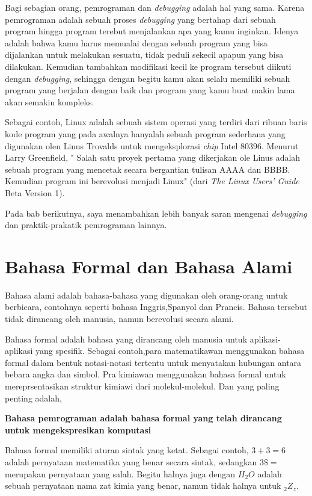 Bagi sebagian orang, pemrograman dan \textit{debugging} adalah hal yang sama. Karena pemrograman adalah sebuah proses \textit{debugging} yang bertahap dari sebuah program hingga program terebut menjalankan apa yang kamu inginkan. Idenya adalah bahwa kamu harus memualai dengan sebuah program yang bisa dijalankan untuk melakukan sesuatu, tidak peduli sekecil apapun yang bisa dilakukan. Kemudian tambahkan modifikasi kecil ke program tersebut diikuti dengan \textit{debugging}, sehingga dengan begitu kamu akan selalu memiliki sebuah program yang berjalan dengan baik dan program yang kamu buat makin lama akan semakin kompleks.

Sebagai contoh, Linux adalah sebuah sistem operasi yang terdiri dari ribuan baris kode program yang pada awalnya hanyalah sebuah program sederhana yang digunakan olen Linus Trovalds untuk mengeksplorasi \textit{chip} Intel 80396. Menurut Larry Greenfield, " Salah satu proyek pertama yang dikerjakan ole Linus adalah sebuah program yang mencetak secara bergantian tulisan AAAA dan BBBB. Kemudian program ini berevolusi menjadi Linux" (dari \textit{The Linux Users' Guide} Beta Version 1).

Pada bab berikutnya, saya menambahkan lebih banyak saran mengenai \textit{debugging} dan praktik-prakatik pemrograman lainnya.


\section{Bahasa Formal dan Bahasa Alami}

Bahasa alami adalah bahasa-bahasa yang digunakan oleh orang-orang untuk berbicara, contohnya seperti bahasa Inggris,Spanyol dan Prancis. Bahasa tersebut tidak dirancang oleh manusia, namun berevolusi secara alami.

Bahasa formal adalah bahasa yang dirancang oleh manusia untuk aplikasi-aplikasi yang spesifik. Sebagai contoh,para matematikawan menggunakan bahasa formal dalam bentuk notasi-notasi tertentu untuk menyatakan hubungan antara bebara angka dan simbol. Pra kimiawan menggunakan bahasa formal untuk mereprsentasikan struktur kimiawi dari molekul-molekul. Dan yang paling penting adalah, 

\textbf{Bahasa pemrograman adalah bahasa formal yang telah dirancang untuk mengekspresikan komputasi}

Bahasa formal memiliki aturan sintak yang ketat. Sebagai contoh, $3+3=6$ adalah pernyataan matematika yang benar secara sintak, sedangkan $ 3\$=$ merupakan pernyataan yang salah. Begitu halnya juga dengan $H_{2}O$ adalah sebuah pernyataan nama zat kimia yang benar, namun tidak halnya untuk $_{2}Z_{z}$.

